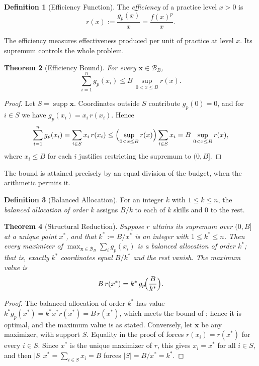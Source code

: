 \documentclass[11pt]{article}
\newtheorem{theorem}{Theorem}[section]
\theoremstyle{definition}
\newtheorem{definition}[theorem]{Definition}
\theoremstyle{remark}
\newcommand{\vx}{\mathbf{x}}
\newcommand{\simplex}{\mathcal{B}}
\newcommand{\supp}{\operatorname{supp}}
\newcommand{\eff}{r}
\begin{document}
\begin{definition}[Efficiency Function]
\label{def:efficiency}
The \emph{efficiency} of a practice level \(x>0\) is
\begin{equation}
    \eff(x)
    :=
    \frac{g_p(x)}{x}
    =
    \frac{f(x)^p}{x}.
    \label{eq:efficiency}
\end{equation}
\end{definition}

The efficiency measures effectiveness produced per unit of practice at
level \(x\). Its supremum controls the whole problem.

\begin{theorem}[Efficiency Bound]
\label{thm:efficiency-bound}
For every \(\vx\in\simplex_B\),
\[
    \sum_{i=1}^n g_p(x_i)
    \leq
    B\,\sup_{0<x\leq B}\eff(x).
\]
\end{theorem}

\begin{proof}
Let \(S=\supp\vx\). Coordinates outside \(S\) contribute
\(g_p(0)=0\), and for \(i\in S\) we have \(g_p(x_i)=x_i\,\eff(x_i)\).
Hence
\[
    \sum_{i=1}^n g_p(x_i)
    =
    \sum_{i\in S} x_i\,\eff(x_i)
    \leq
    \Bigl(\sup_{0<x\leq B}\eff(x)\Bigr)\sum_{i\in S} x_i
    =
    B\,\sup_{0<x\leq B}\eff(x),
\]
where \(x_i\leq B\) for each \(i\) justifies restricting the supremum to
\((0,B]\).
\end{proof}

The bound is attained precisely by an equal division of the budget, when
the arithmetic permits it.

\begin{definition}[Balanced Allocation]
\label{def:balanced}
For an integer \(k\) with \(1\leq k\leq n\), the \emph{balanced allocation
of order \(k\)} assigns \(B/k\) to each of \(k\) skills and \(0\) to the
rest.
\end{definition}

\begin{theorem}[Structural Reduction]
\label{thm:structural}
Suppose \(\eff\) attains its supremum over \((0,B]\) at a unique point
\(x^*\), and that \(k^*:=B/x^*\) is an integer with \(1\leq k^*\leq n\).
Then every maximizer of \(\max_{\vx\in\simplex_B}\sum_i g_p(x_i)\) is a
balanced allocation of order \(k^*\); that is, exactly \(k^*\) coordinates
equal \(B/k^*\) and the rest vanish. The maximum value is
\[
    B\,\eff(x^*)
    =
    k^*\,g_p\!\Bigl(\frac{B}{k^*}\Bigr).
\]
\end{theorem}

\begin{proof}
The balanced allocation of order \(k^*\) has value
\(k^* g_p(x^*)=k^* x^*\eff(x^*)=B\,\eff(x^*)\), which meets the bound of
; hence it is optimal, and the maximum value is
as stated. Conversely, let \(\vx\) be any maximizer, with support \(S\).
Equality in the proof of  forces
\(\eff(x_i)=\eff(x^*)\) for every \(i\in S\). Since \(x^*\) is the unique
maximizer of \(\eff\), this gives \(x_i=x^*\) for all \(i\in S\), and then
\(|S|\,x^*=\sum_{i\in S}x_i=B\) forces \(|S|=B/x^*=k^*\).
\end{proof}
\end{document}

